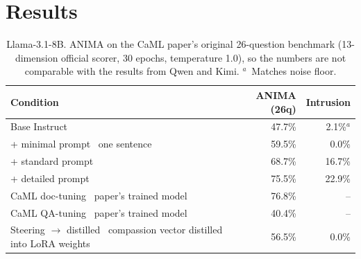 \documentclass[letter]{article}
\begin{document}

\section{Results}

\newcommand{\sub}[1]{~{\scriptsize\color{gray}#1}}
\newcommand{\nores}{--}

\begin{table}[H]
\centering
\begin{tabular}{@{}lrr@{}}
\toprule
Condition & ANIMA (26q) & Intrusion \\
\midrule
Base Instruct & 47.7\% & 2.1\%$^{a}$ \\
+ minimal prompt \sub{one sentence} & 59.5\% & 0.0\% \\
+ standard prompt & 68.7\% & 16.7\% \\
+ detailed prompt & 75.5\% & 22.9\% \\
CaML doc-tuning \sub{paper's trained model} & 76.8\% & \nores \\
CaML QA-tuning \sub{paper's trained model} & 40.4\% & \nores \\
Steering $\rightarrow$ distilled \sub{compassion vector distilled into LoRA weights} & 56.5\% & 0.0\% \\
\bottomrule
\end{tabular}
\caption{Llama-3.1-8B. ANIMA on the CaML paper's original 26-question benchmark (13-dimension official scorer, 30 epochs, temperature 1.0), so the numbers are not comparable with the results from Qwen and Kimi. $^{a}$~Matches noise floor.}
\label{tab:llama}
\end{table}
\end{document}
